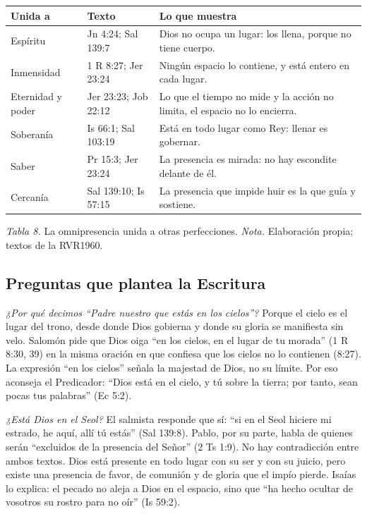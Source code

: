 \begin{center}\small\renewcommand{\arraystretch}{1.22}
\begin{tabular}{@{}L{2.6cm}L{4.4cm}L{7.0cm}@{}}
\toprule
\textbf{Unida a} & \textbf{Texto} & \textbf{Lo que muestra} \\ \midrule
Espíritu & Jn 4:24; Sal 139:7 & Dios no ocupa un lugar: los llena, porque no tiene cuerpo. \\
Inmensidad & 1 R 8:27; Jer 23:24 & Ningún espacio lo contiene, y está entero en cada lugar. \\
Eternidad y poder & Jer 23:23; Job 22:12 & Lo que el tiempo no mide y la acción no limita, el espacio no lo encierra. \\
Soberanía & Is 66:1; Sal 103:19 & Está en todo lugar como Rey: llenar es gobernar. \\
Saber & Pr 15:3; Jer 23:24 & La presencia es mirada: no hay escondite delante de él. \\
Cercanía & Sal 139:10; Is 57:15 & La presencia que impide huir es la que guía y sostiene. \\
\bottomrule
\end{tabular}\par
{\footnotesize\color{gris}\textit{Tabla 8.} La omnipresencia unida a otras perfecciones. \textit{Nota.} Elaboración propia; textos de la RVR1960.}
\end{center}

\subsection{Preguntas que plantea la Escritura}

\emph{¿Por qué decimos ``Padre nuestro que estás en los cielos''?} Porque el cielo es el lugar del trono, desde donde Dios gobierna y donde su gloria se manifiesta sin velo. Salomón pide que Dios oiga ``en los cielos, en el lugar de tu morada'' (1 R 8:30, 39) en la misma oración en que confiesa que los cielos no lo contienen (8:27). La expresión ``en los cielos'' señala la majestad de Dios, no su límite. Por eso aconseja el Predicador: ``Dios está en el cielo, y tú sobre la tierra; por tanto, sean pocas tus palabras'' (Ec 5:2).

\emph{¿Está Dios en el Seol?} El salmista responde que sí: ``si en el Seol hiciere mi estrado, he aquí, allí tú estás'' (Sal 139:8). Pablo, por su parte, habla de quienes serán ``excluidos de la presencia del Señor'' (2 Ts 1:9). No hay contradicción entre ambos textos. Dios está presente en todo lugar con su ser y con su juicio, pero existe una presencia de favor, de comunión y de gloria que el impío pierde. Isaías lo explica: el pecado no aleja a Dios en el espacio, sino que ``ha hecho ocultar de vosotros su rostro para no oír'' (Is 59:2).

